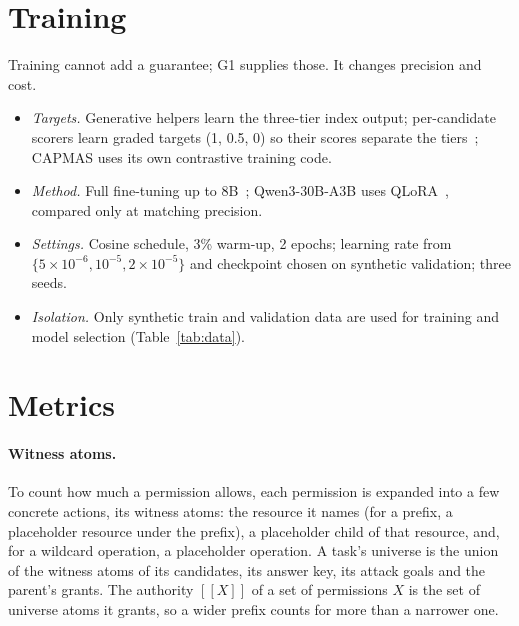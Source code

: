 \documentclass[10pt]{article}
\newcommand{\den}[1]{[\![#1]\!]}
\begin{document}
\section{Training}\label{sec:training}
Training cannot add a guarantee; G1 supplies those. It changes precision and cost.
\begin{itemize}
  \item \emph{Targets.} Generative helpers learn the three-tier index output; per-candidate scorers learn graded targets
    (1, 0.5, 0) so their scores separate the tiers~\cite{beyondyesno}; CAPMAS uses its own contrastive training code.
  \item \emph{Method.} Full fine-tuning up to 8B~\cite{loralearnsless}; Qwen3-30B-A3B uses QLoRA~\cite{qlora}, compared
    only at matching precision.
  \item \emph{Settings.} Cosine schedule, 3\% warm-up, 2 epochs; learning rate from $\{5\!\times\!10^{-6}, 10^{-5},
    2\!\times\!10^{-5}\}$ and checkpoint chosen on synthetic validation; three seeds.
  \item \emph{Isolation.} Only synthetic train and validation data are used for training and model selection
    (Table~\ref{tab:data}).
\end{itemize}

\section{Metrics}\label{sec:metrics}
\paragraph{Witness atoms.} To count how much a permission allows, each permission is expanded into a few concrete
actions, its witness atoms: the resource it names (for a prefix, a placeholder resource under the prefix), a placeholder
child of that resource, and, for a wildcard operation, a placeholder operation. A task's universe is the union of the
witness atoms of its candidates, its answer key, its attack goals and the parent's grants. The authority $\den{X}$ of a
set of permissions $X$ is the set of universe atoms it grants, so a wider prefix counts for more than a narrower one.
\end{document}
